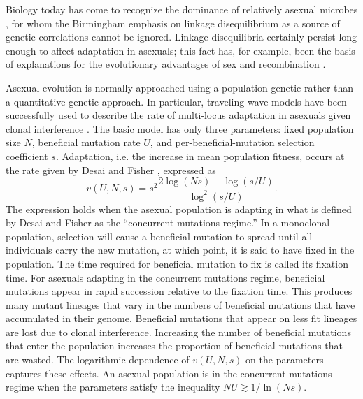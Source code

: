 \documentclass[9pt,twocolumn,twoside]{gsajnl}
\begin{document}
Biology today has come to recognize the dominance of relatively asexual microbes \cite{mcfall2013animals}, for whom the Birmingham emphasis on linkage disequilibrium as a source of genetic correlations cannot be ignored. Linkage disequilibria certainly persist long enough to affect adaptation in asexuals; this fact has, for example, been the basis of explanations for the evolutionary advantages of sex and recombination \citep{Barton2005,Otto2009}. \par
% 
% 
% 
%
Asexual evolution is normally approached using a population genetic rather than a quantitative genetic approach. In particular, traveling wave models have been successfully used to describe the rate of multi-locus adaptation in asexuals given clonal interference \citep{rouzine2003solitary,desai2007beneficial}.  The basic model has only three parameters: fixed population size $N$, beneficial mutation rate $U$, and per-beneficial-mutation selection coefficient $s$. Adaptation, i.e. the increase in mean population fitness, occurs at the rate given by Desai and Fisher \citep[Equation 41]{desai2007beneficial}, expressed as
% 
% 
% 
%
\begin{equation}\label{eq:1}
v(U,N,s) = s^2\frac{2\log(N s)-\log(s/U)}{\log^2(s/U)}.
\end{equation}
The expression holds when the asexual population is adapting in what is defined by Desai and Fisher as the ``concurrent mutations regime.'' In a monoclonal population, selection will cause a beneficial mutation to spread until all individuals carry the new mutation, at which point, it is said to have fixed in the population. The time required for beneficial mutation to fix is called its fixation time. For asexuals adapting in the concurrent mutations regime, beneficial mutations appear in rapid succession relative to the fixation time. This produces many mutant lineages that vary in the numbers of beneficial mutations that have accumulated in their genome. Beneficial mutations that appear on less fit lineages are lost due to clonal interference. Increasing the number of beneficial mutations that enter the population increases the proportion of beneficial mutations that are wasted.  The logarithmic dependence of $v(U,N,s)$ on the parameters captures these effects. An asexual population is in the concurrent mutations regime when the parameters satisfy the inequality $NU \gtrsim 1/\ln(Ns)$.  \par
\end{document}
